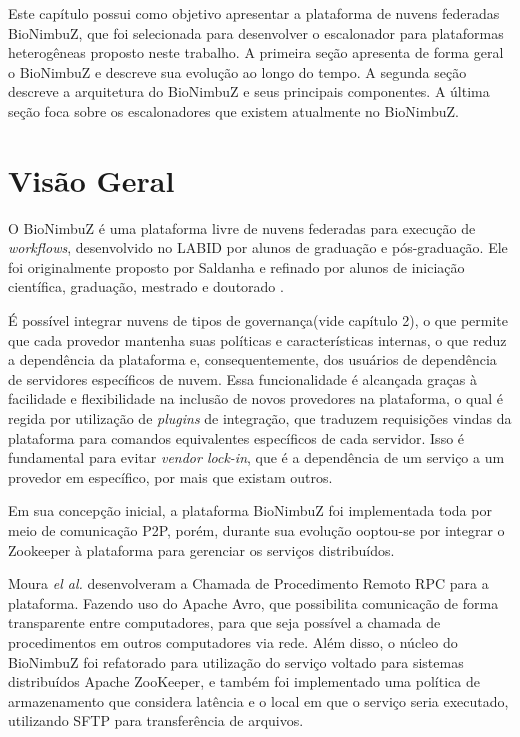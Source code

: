 Este capítulo possui como objetivo apresentar a plataforma de nuvens federadas BioNimbuZ, que foi selecionada para desenvolver o escalonador para plataformas heterogêneas proposto neste trabalho. A primeira seção apresenta de forma geral o BioNimbuZ e descreve sua evolução ao longo do tempo. A segunda seção descreve a arquitetura do BioNimbuZ e seus principais componentes. A última seção foca sobre os escalonadores que existem atualmente no BioNimbuZ.

\section{Visão Geral}

O BioNimbuZ é uma plataforma livre de nuvens federadas para execução de \textit{workflows}, desenvolvido no \acrfull{LABID} por alunos de graduação e pós-graduação. Ele foi originalmente proposto por Saldanha\cite{Saldanha_BioNimbus} e refinado por alunos de iniciação científica, graduação, mestrado e doutorado\cite{BioNimbuZ_Breno_Deric} \cite{BioNimbuZ_6846526} \cite{6732620_BioNimbuZ_ACOsched} \cite{BioNimbuZ_Willian_C99} \cite{closer12_BioNimbuZ_AHP} \cite{BioNimbuZ_Vegara}.

É possível integrar nuvens de tipos de governança(vide capítulo 2), o que permite que cada provedor mantenha suas políticas e características internas, o que reduz a dependência da plataforma e, consequentemente, dos usuários de dependência de servidores específicos de nuvem. Essa funcionalidade é alcançada graças à facilidade e flexibilidade na inclusão de novos provedores na plataforma, o qual é regida por utilização de \textit{plugins} de integração, que traduzem requisições vindas da plataforma para comandos equivalentes específicos de cada servidor. Isso é fundamental para evitar \textit{vendor lock-in}\cite{VendorLockInDef}, que é a dependência de um serviço a um provedor em específico, por mais que existam outros.

Em sua concepção inicial, a plataforma BioNimbuZ foi implementada toda por meio de comunicação \acrfull{P2P}, porém, durante sua evolução ooptou-se por integrar o Zookeeper\cite{Zookeeper} à plataforma para gerenciar os serviços distribuídos. %

Moura \textit{el al.}\cite{BioNimbuZ_6846526} desenvolveram a Chamada de Procedimento Remoto \acrshort{RPC}\cite{RPC_1701928} para a plataforma. Fazendo uso do Apache Avro\cite{Avro}, que possibilita comunicação de forma transparente entre computadores, para que seja possível a chamada de procedimentos em outros computadores via rede. Além disso, o núcleo do BioNimbuZ foi refatorado para utilização do serviço voltado para sistemas distribuídos Apache ZooKeeper\cite{Zookeeper}, e também foi implementado uma política de armazenamento que considera latência e o local em que o serviço seria executado, utilizando \acrfull{SFTP} para transferência de arquivos.


